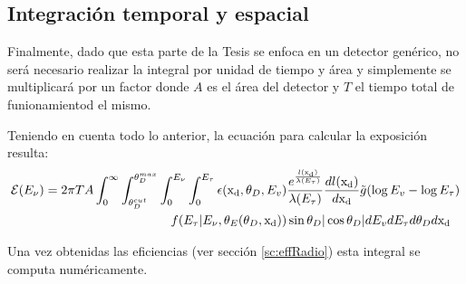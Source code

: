 	\subsection{Integraci\'on temporal y espacial}
	Finalmente, dado que esta parte de la Tesis se enfoca en un detector gen\'erico, no ser\'a necesario realizar la integral por unidad de tiempo y \'area y simplemente se multiplicar\'a por un factor donde $A$ es el \'area del detector y $T$ el tiempo total de funionamientod el mismo.
	
	Teniendo en cuenta todo lo anterior, la ecuaci\'on para calcular la exposici\'on resulta:
	\begin{equation}
		\begin{aligned}
			{\cal E} (E_\nu) = 2 \pi T A
			\int_{0}^{\infty} 
			\int_{\theta_D^{cut}}^{\theta_D^{max}} 
			\int_{0}^{E_\nu} 
			\int_{0}^{E_\tau} 
			\epsilon ({\rm x_d},\theta_D,E_v)& 
			\frac{e^{\frac{l({\rm x_d})}{\lambda(E_\tau)}}}{\lambda(E_\tau)}\frac{dl({\rm x_d})}{d{\rm x_d}}
			\tilde{g}(\log E_v-\log E_\tau)\\
			f(E_\tau|E_\nu,\theta_E(\theta_D,{\rm x_d}))
			&\sin \theta_D |\cos \theta_D|
			dE_v dE_\tau  d\theta_D d{\rm x_d}
		\end{aligned}
		\label{eq:exp2ESRadio}
	\end{equation}

	Una vez obtenidas las eficiencias (ver secci\'on \ref{sc:effRadio}) esta integral se computa num\'ericamente.
	
	
